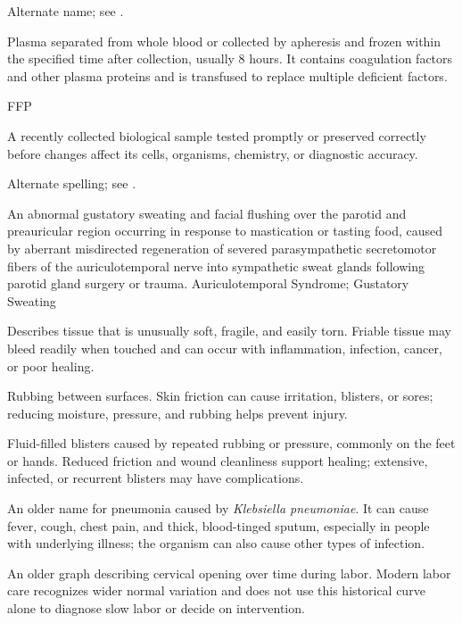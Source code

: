  Alternate name; see .

 Plasma separated from whole blood or collected by apheresis and frozen within the specified time after collection, usually 8 hours. It contains coagulation factors and other plasma proteins and is transfused to replace multiple deficient factors.

\synonyms
FFP

 A recently collected biological sample tested promptly or preserved correctly before changes affect its cells, organisms, chemistry, or diagnostic accuracy.

 Alternate spelling; see .

 An abnormal gustatory sweating and facial flushing over the parotid and preauricular region occurring in response to mastication or tasting food, caused by aberrant misdirected regeneration of severed parasympathetic secretomotor fibers of the auriculotemporal nerve into sympathetic sweat glands following parotid gland surgery or trauma.
\synonyms
Auriculotemporal Syndrome; Gustatory Sweating

 Describes tissue that is unusually soft, fragile, and easily torn. Friable tissue may bleed readily when touched and can occur with inflammation, infection, cancer, or poor healing.

 Rubbing between surfaces. Skin friction can cause irritation, blisters, or sores; reducing moisture, pressure, and rubbing helps prevent injury.

 Fluid-filled blisters caused by repeated rubbing or pressure, commonly on the feet or hands. Reduced friction and wound cleanliness support healing; extensive, infected, or recurrent blisters may have complications.

 An older name for pneumonia caused by \textit{Klebsiella pneumoniae}. It can cause fever, cough, chest pain, and thick, blood-tinged sputum, especially in people with underlying illness; the organism can also cause other types of infection.

 An older graph describing cervical opening over time during labor. Modern labor care recognizes wider normal variation and does not use this historical curve alone to diagnose slow labor or decide on intervention.

